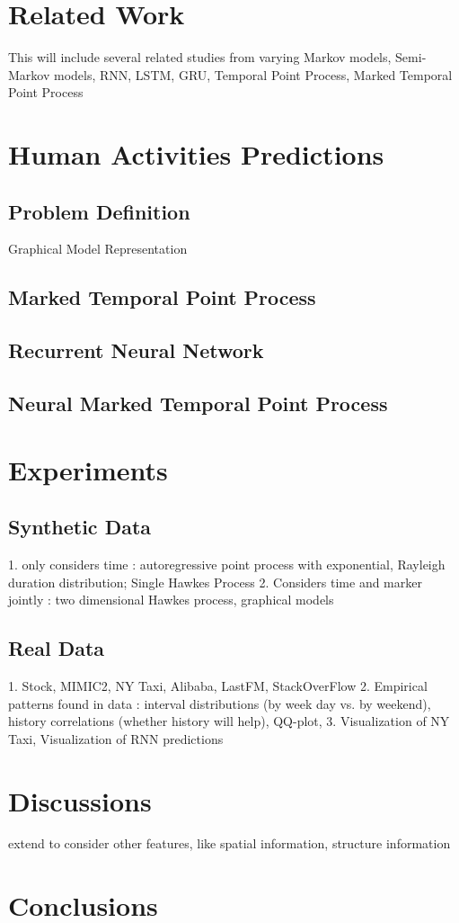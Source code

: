 \documentclass{sig-alternate-05-2015}
\begin{document}
\section{Related Work}
This will include several related studies from varying Markov models, Semi-Markov models, RNN, LSTM, GRU, Temporal Point Process, Marked Temporal Point Process

\section{Human Activities Predictions}
\subsection{Problem Definition}
Graphical Model Representation
\subsection{Marked Temporal Point Process}
\subsection{Recurrent Neural Network}
\subsection{Neural Marked Temporal Point Process}

\section{Experiments}
\subsection{Synthetic Data}
1. only considers time : autoregressive point process with exponential, Rayleigh duration distribution; Single Hawkes Process
2. Considers time and marker jointly : two dimensional Hawkes process, graphical models
\subsection{Real Data}
1. Stock, MIMIC2, NY Taxi, Alibaba, LastFM, StackOverFlow
2. Empirical patterns found in data : interval distributions (by week day vs. by weekend), history correlations (whether history will help), QQ-plot, 
3. Visualization of NY Taxi, Visualization of RNN predictions
\section{Discussions}
extend to consider other features, like spatial information, structure information
\section{Conclusions}
\end{document}
